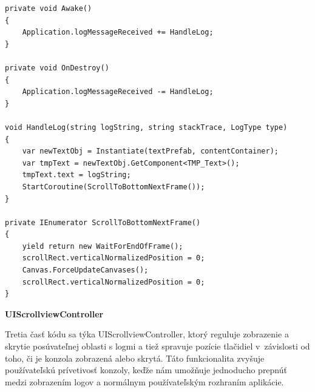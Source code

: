 \lstset{style=Csharp}
\begin{lstlisting}[caption={DebugUI Class - Kontrolér pre vizuálne zobrazenie logov}, label=debugUi]
private void Awake()
{
    Application.logMessageReceived += HandleLog;
}

private void OnDestroy()
{
    Application.logMessageReceived -= HandleLog;
}

void HandleLog(string logString, string stackTrace, LogType type)
{
    var newTextObj = Instantiate(textPrefab, contentContainer);
    var tmpText = newTextObj.GetComponent<TMP_Text>();
    tmpText.text = logString;
    StartCoroutine(ScrollToBottomNextFrame());
}

private IEnumerator ScrollToBottomNextFrame()
{
    yield return new WaitForEndOfFrame();
    scrollRect.verticalNormalizedPosition = 0;
    Canvas.ForceUpdateCanvases();
    scrollRect.verticalNormalizedPosition = 0;
}
\end{lstlisting} 

{\normalsize\textbf{UIScrollviewController}}

Tretia časť kódu sa týka UIScrollviewController, ktorý reguluje zobrazenie a skrytie posúvateľnej oblasti s logmi a tiež spravuje pozície tlačidiel v~závislosti od toho, či je konzola zobrazená alebo skrytá. Táto funkcionalita zvyšuje používateľskú prívetivosť konzoly, keďže nám umožňuje jednoducho prepnúť medzi zobrazením logov a normálnym používateľským rozhraním aplikácie.

